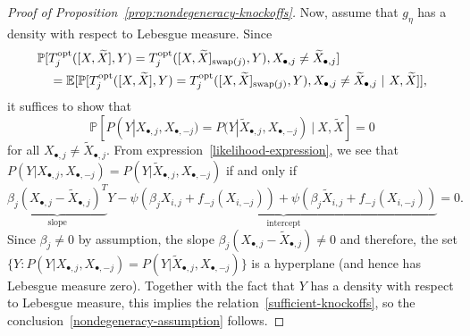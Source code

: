 \documentclass[12pt]{article}
\theoremstyle{definition}
\theoremstyle{remark}
\newcommand{\srx}{X}
\newcommand{\srxk}{\widetilde X}
\newcommand{\sry}{Y}
\begin{document}
\begin{proof}[Proof of Proposition~\ref{prop:nondegeneracy-knockoffs}]
	Now, assume that $g_\eta$ has a density with respect to Lebesgue measure. Since
	\begin{equation*}
	\begin{split}
	&\mathbb P[T^{\textnormal{opt}}_j([\srx, \srxk], \sry) = T^{\textnormal{opt}}_j([\srx, \srxk]_{\textnormal{swap}(j)}, \sry), \srx_{\bullet,j} \neq \srxk_{\bullet,j}] \\
	&\quad= \mathbb E[\mathbb P[T^{\textnormal{opt}}_j([\srx, \srxk], \sry) = T^{\textnormal{opt}}_j([\srx, \srxk]_{\textnormal{swap}(j)}, \sry), \srx_{\bullet,j} \neq \srxk_{\bullet,j}\ |\ \srx, \srxk]],
	\end{split}
	\end{equation*}
	it suffices to show that
	\begin{equation}
	\mathbb P[P(\sry|\srx_{\bullet,j}, \srx_{\bullet,-j}) = P(\sry|\srxk_{\bullet,j}, \srx_{\bullet,-j})\ |\ \srx, \srxk] = 0
	\label{sufficient-knockoffs}
	\end{equation}
	for all $\srx_{\bullet,j} \neq \srxk_{\bullet,j}$. From expression~\eqref{likelihood-expression}, we see that $P(\sry|\srx_{\bullet,j}, \srx_{\bullet,-j}) = P(\sry|\srxk_{\bullet,j}, \srx_{\bullet,-j})$ if and only if
	\begin{equation*}
	\underbrace{\beta_j (\srx_{\bullet,j} - \srxk_{\bullet,j})^T}_{\text{slope}} \sry - \underbrace{\psi(\beta_j \srx_{i,j} + f_{-j}(\srx_{i,-j})) + \psi(\beta_j \srxk_{i,j} + f_{-j}(\srx_{i,-j}))}_{\text{intercept}} = 0.
	\end{equation*}
	Since $\beta_j \neq 0$ by assumption, the slope $\beta_j (\srx_{\bullet,j} - \srxk_{\bullet,j}) \neq 0$ and therefore, the set $\{\sry: P(\sry|\srx_{\bullet,j}, \srx_{\bullet,-j}) = P(\sry|\srxk_{\bullet,j}, \srx_{\bullet,-j})\}$ is a hyperplane (and hence has Lebesgue measure zero). Together with the fact that $\sry$ has a density with respect to Lebesgue measure, this implies the relation~\eqref{sufficient-knockoffs}, so the conclusion~\eqref{nondegeneracy-assumption} follows. 
\end{proof}
\end{document}
